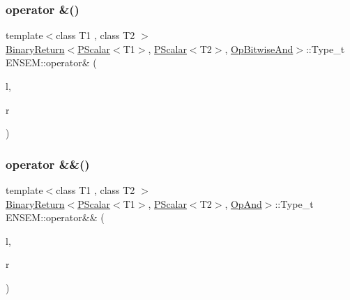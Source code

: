 \subsubsection{\texorpdfstring{operator \&()}{operator \&()}}
{\footnotesize\ttfamily template$<$class T1 , class T2 $>$ \\
\mbox{\hyperlink{structENSEM_1_1BinaryReturn}{Binary\+Return}}$<$\mbox{\hyperlink{classENSEM_1_1PScalar}{P\+Scalar}}$<$T1$>$, \mbox{\hyperlink{classENSEM_1_1PScalar}{P\+Scalar}}$<$T2$>$, \mbox{\hyperlink{structENSEM_1_1OpBitwiseAnd}{Op\+Bitwise\+And}}$>$\+::Type\+\_\+t E\+N\+S\+E\+M\+::operator\& (\begin{DoxyParamCaption}\item[{const \mbox{\hyperlink{classENSEM_1_1PScalar}{P\+Scalar}}$<$ T1 $>$ \&}]{l,  }\item[{const \mbox{\hyperlink{classENSEM_1_1PScalar}{P\+Scalar}}$<$ T2 $>$ \&}]{r }\end{DoxyParamCaption})\hspace{0.3cm}{\ttfamily [inline]}}

\mbox{\label{group__primscalar_ga3853388d3b3d994d263d1da57ffcb055}} 
\subsubsection{\texorpdfstring{operator \&\&()}{operator \&\&()}}
{\footnotesize\ttfamily template$<$class T1 , class T2 $>$ \\
\mbox{\hyperlink{structENSEM_1_1BinaryReturn}{Binary\+Return}}$<$\mbox{\hyperlink{classENSEM_1_1PScalar}{P\+Scalar}}$<$T1$>$, \mbox{\hyperlink{classENSEM_1_1PScalar}{P\+Scalar}}$<$T2$>$, \mbox{\hyperlink{structENSEM_1_1OpAnd}{Op\+And}}$>$\+::Type\+\_\+t E\+N\+S\+E\+M\+::operator\&\& (\begin{DoxyParamCaption}\item[{const \mbox{\hyperlink{classENSEM_1_1PScalar}{P\+Scalar}}$<$ T1 $>$ \&}]{l,  }\item[{const \mbox{\hyperlink{classENSEM_1_1PScalar}{P\+Scalar}}$<$ T2 $>$ \&}]{r }\end{DoxyParamCaption})\hspace{0.3cm}{\ttfamily [inline]}}

\mbox{\label{group__primscalar_gafea5191a2ebdc35856d62d9284d246be}} 
